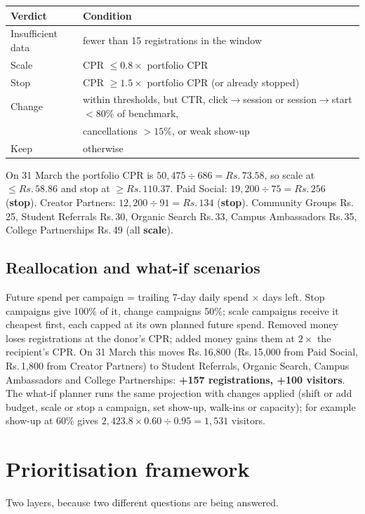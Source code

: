 \documentclass[11pt,a4paper]{article}
\newcommand{\rs}{Rs.\,}
\begin{document}
\begin{center}\small
\begin{tabular}{@{}ll@{}}
\toprule
\textbf{Verdict} & \textbf{Condition} \\
\midrule
Insufficient data & fewer than 15 registrations in the window \\
Scale & CPR $\le 0.8 \times$ portfolio CPR \\
Stop & CPR $\ge 1.5 \times$ portfolio CPR (or already stopped) \\
Change & within thresholds, but CTR, click$\to$session or session$\to$start $<80\%$ of benchmark, \\ & cancellations $>15\%$, or weak show-up \\
Keep & otherwise \\
\bottomrule
\end{tabular}
\end{center}
\noindent On 31 March the portfolio CPR is $50{,}475 \div 686 = \rs73.58$, so scale at $\le\rs58.86$ and stop at $\ge\rs110.37$. Paid Social: $19{,}200 \div 75 = \rs256$ (\textbf{stop}). Creator Partners: $12{,}200 \div 91 = \rs134$ (\textbf{stop}). Community Groups \rs25, Student Referrals \rs30, Organic Search \rs33, Campus Ambassadors \rs35, College Partnerships \rs49 (all \textbf{scale}).

\subsection{Reallocation and what-if scenarios}
Future spend per campaign = trailing 7-day daily spend $\times$ days left. Stop campaigns give 100\% of it, change campaigns 50\%; scale campaigns receive it cheapest first, each capped at its own planned future spend. Removed money loses registrations at the donor's CPR; added money gains them at $2\times$ the recipient's CPR. On 31 March this moves \rs16,800 (\rs15,000 from Paid Social, \rs1,800 from Creator Partners) to Student Referrals, Organic Search, Campus Ambassadors and College Partnerships: \textbf{+157 registrations, +100 visitors}. The what-if planner runs the same projection with changes applied (shift or add budget, scale or stop a campaign, set show-up, walk-ins or capacity); for example show-up at 60\% gives $2{,}423.8 \times 0.60 \div 0.95 = 1{,}531$ visitors.

\section{Prioritisation framework}\label{sec:rice}
Two layers, because two different questions are being answered.
\end{document}
